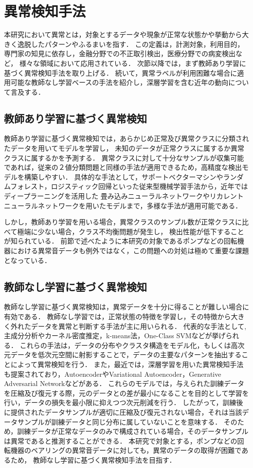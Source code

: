 \documentclass[../main]{subfiles}
\begin{document}
\section{異常検知手法}
本研究において異常とは，対象とするデータや現象が正常な状態かや挙動から大きく逸脱したパターンやふるまいを指す．
この定義は，計測対象，利用目的，専門家の知見に依存し，金融分野での不正取引検出，医療分野での病変検出など，
様々な領域において応用されている．
次節以降では，まず教師あり学習に基づく異常検知手法を取り上げる．
続いて，異常ラベルが利用困難な場合に適用可能な教師なし学習ベースの手法を紹介し，深層学習を含む近年の動向について言及する．
\subsection{教師あり学習に基づく異常検知}
教師あり学習に基づく異常検知では，あらかじめ正常及び異常クラスに分類されたデータを用いてモデルを学習し，
未知のデータが正常クラスに属するか異常クラスに属するかを予測する．
異常クラスに対して十分なサンプルが収集可能であれば，従来の２値分類問題と同様の手法が適用できるため，高精度な検出モデルを構築しやすい．
具体的な手法として，サポートベクターマシンやランダムフォレスト，ロジスティック回帰といった従来型機械学習手法から，近年ではディープラーニングを活用した
畳み込みニューラルネットワークやリカレントニューラルネットワークを用いたモデルまで，多様な手法が適用可能である．

しかし，教師あり学習を用いる場合，異常クラスのサンプル数が正常クラスに比べて極端に少ない場合，クラス不均衡問題が発生し，
検出性能が低下することが知られている．
前節で述べたように本研究の対象であるポンプなどの回転機器における異常音データも例外ではなく，この問題への対処は極めて重要な課題となっている．

\subsection{教師なし学習に基づく異常検知}
教師なし学習に基づく異常検知は，異常データを十分に得ることが難しい場合に有効である．
教師なし学習では，正常状態の特徴を学習し，その特徴から大きく外れたデータを異常と判断する手法が主に用いられる．
代表的な手法として, 主成分分析やカーネル密度推定，k-means法，One-Class SVMなどが挙げられる．
これらの手法は，データの分布やクラスタ構造をモデル化，もしくは高次元データを低次元空間に射影することで，データの主要なパターンを抽出することによって異常検知を行う．
また，最近では，深層学習を用いた異常検知手法も提案されており，AutoencoderやVariational Autoencoder，Generative Adversarial Networkなどがある．
これらのモデルでは，与えられた訓練データを圧縮及び復元する際，元のデータとの差が最小になることを目的として学習を行い，データの損失を最小限に抑えつつ次元削減を行う．
したがって，訓練後に提供されたデータサンプルが適切に圧縮及び復元されない場合，それは当該データサンプルが訓練データと同じ分布に属していないことを意味する．
そのため，訓練データが正常なデータのみで構成されている場合，そのデータサンプルは異常であると推測することができる．
本研究で対象とする，ポンプなどの回転機器のベアリングの異常音データに対しても，異常のデータの取得が困難であるため，
教師なし学習に基づく異常検知手法を目指す．
\end{document}
